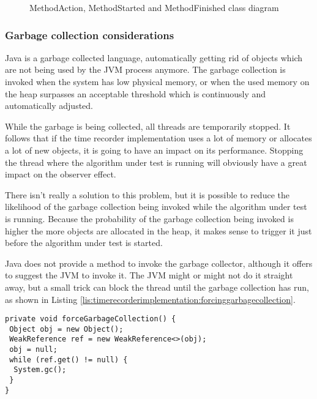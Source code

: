 \begin{figure}
  \centering
  \caption{MethodAction, MethodStarted and MethodFinished class diagram}
  \label{fig:timerecorerimplementation:methodsclassdiagram}
\end{figure}

\subsubsection{Garbage collection considerations}
Java is a garbage collected language, automatically getting rid of objects which are not being used by the JVM process anymore. The garbage collection is invoked when the system has low physical memory, or when the used memory on the heap surpasses an acceptable threshold which is continuously and automatically adjusted.

\noindent While the garbage is being collected, all threads are temporarily stopped. It follows that if the time recorder implementation uses a lot of memory or allocates a lot of new objects, it is going to have an impact on its performance. Stopping the thread where the algorithm under test is running will obviously have a great impact on the observer effect.

\noindent There isn't really a solution to this problem, but it is possible to reduce the likelihood of the garbage collection being invoked while the algorithm under test is running. 
Because the probability of the garbage collection being invoked is higher the more objects are allocated in the heap, it makes sense to trigger it just before the algorithm under test is started.

\noindent Java does not provide a method to invoke the garbage collector, although it offers  to suggest the JVM to invoke it. The JVM might or might not do it straight away, but a small trick can block the thread until the garbage collection has run, as shown in Listing \ref{lis:timerecorderimplementation:forcinggarbagecollection}.

\noindent\begin{minipage}[c]{\linewidth}
\begin{lstlisting}[breaklines,caption={Forcing the garbage collection},label=lis:timerecorderimplementation:forcinggarbagecollection]
private void forceGarbageCollection() {
 Object obj = new Object();
 WeakReference ref = new WeakReference<>(obj);
 obj = null;
 while (ref.get() != null) {
  System.gc();
 }
}
\end{lstlisting}
\end{minipage}


